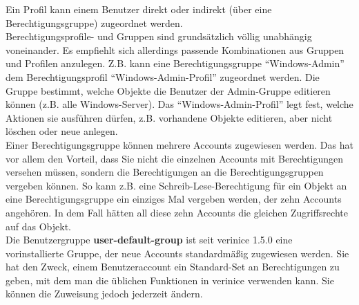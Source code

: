 \documentclass[a4paper,10pt]{book}
\begin{document}
Ein Profil kann einem Benutzer direkt oder indirekt (über eine Berechtigungsgruppe) zugeordnet werden.
\newline\\
Berechtigungsprofile- und Gruppen sind grundsätzlich völlig unabhängig voneinander. Es empfiehlt sich allerdings passende Kombinationen aus Gruppen
und Profilen anzulegen. Z.B. kann eine Berechtigungsgruppe ``Windows-Admin'' dem Berechtigungsprofil ``Windows-Admin-Profil'' zugeordnet werden.
Die Gruppe bestimmt, welche Objekte die Benutzer der Admin-Gruppe editieren können (z.B. alle Windows-Server). Das ``Windows-Admin-Profil'' legt fest,
welche Aktionen sie ausführen dürfen, z.B. vorhandene Objekte editieren, aber nicht löschen oder neue anlegen.
\newline\\
Einer Berechtigungsgruppe können mehrere Accounts zugewiesen werden. Das hat vor allem den Vorteil, dass Sie nicht die einzelnen
Accounts mit Berechtigungen versehen müssen, sondern die Berechtigungen an die Berechtigungsgruppen vergeben können. So kann z.B.
eine Schreib-Lese-Berechtigung für ein Objekt an eine Berechtigungsgruppe ein einziges Mal vergeben werden, der zehn Accounts angehören.
In dem Fall hätten all diese zehn Accounts die gleichen Zugriffsrechte auf das Objekt.
\newline\\
Die Benutzergruppe \textbf{user-default-group} ist seit verinice 1.5.0 eine vorinstallierte Gruppe, der neue Accounts standardmäßig
zugewiesen werden. Sie hat den Zweck, einem Benutzeraccount ein Standard-Set an Berechtigungen zu geben, mit dem man die üblichen Funktionen
in verinice verwenden kann. Sie können die Zuweisung jedoch jederzeit ändern.
\end{document}
